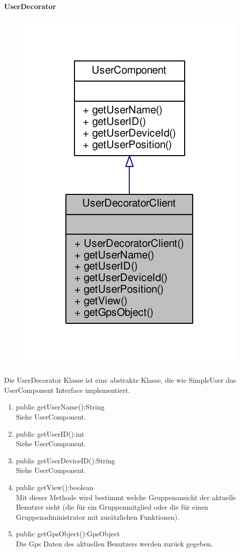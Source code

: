 \textbf{UserDecorator}
\begin{figure}[H]
	\includegraphics[scale = 1]{res/umlClasses/user_decorator_client__coll__graph.pdf}
	\centering
\end{figure}
Die UserDecorator Klasse ist eine abstrakte Klasse, die wie SimpleUser das UserComponent Interface implementiert. 
\begin{enumerate}
	\item public getUserName():String\\
		Siehe UserComponent.
	\item public getUserID():int\\
		Siehe UserComponent.
	\item public getUserDeviceID():String\\
		Siehe UserComponent.
	\item public getView():boolean\\
		Mit dieser Methode wird bestimmt welche Gruppenansicht der aktuelle Benutzer sieht (die für ein Gruppenmitglied oder die für einen Gruppenadministrator mit zusätzlichen Funktionen).
	\item public getGpsObject():GpsObject\\
		Die Gps Daten des aktuellen Benutzers werden zurück gegeben.
\end{enumerate}

